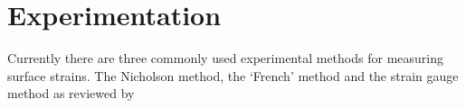 \section{Experimentation}
Currently there are three commonly used experimental methods for measuring
surface strains. The Nicholson method, the `French' method and the strain
gauge method as reviewed by \cite{Murphy_2005}